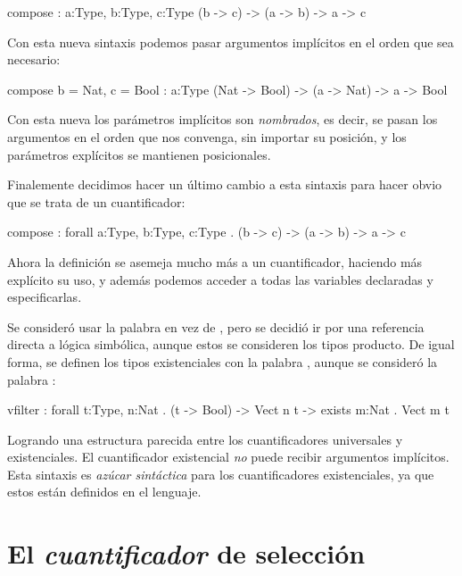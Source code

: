 \begin{blueleft}
\begin{anglercode}
compose : { a:Type, b:Type, c:Type } (b -> c) -> (a -> b) -> a -> c
\end{anglercode}

Con esta nueva sintaxis podemos pasar argumentos implícitos en el orden que sea necesario:

\begin{anglercode}
compose { b = Nat, c = Bool } : { a:Type } (Nat -> Bool) -> (a -> Nat) -> a -> Bool
\end{anglercode}

Con esta nueva los parámetros implícitos son \emph{nombrados}, es decir, se pasan los argumentos en el orden que nos convenga, sin importar su posición, y los parámetros explícitos se mantienen posicionales.

Finalemente decidimos hacer un último cambio a esta sintaxis para hacer obvio que se trata de un cuantificador:

\begin{anglercode}
compose : forall a:Type, b:Type, c:Type . (b -> c) -> (a -> b) -> a -> c
\end{anglercode}

Ahora la definición se asemeja mucho más a un cuantificador, haciendo más explícito su uso, y además podemos acceder a todas las variables declaradas y especificarlas.

Se consideró usar la palabra  en vez de , pero se decidió ir por una referencia directa a lógica simbólica, aunque estos se consideren los tipos producto. De igual forma, se definen los tipos existenciales con la palabra , aunque se consideró la palabra :

\begin{anglercode}
vfilter : forall t:Type, n:Nat . (t -> Bool) -> Vect n t -> exists m:Nat . Vect m t
\end{anglercode}

Logrando una estructura parecida entre los cuantificadores universales y existenciales. El cuantificador existencial \emph{no} puede recibir argumentos implícitos. Esta sintaxis es \emph{azúcar sintáctica} para los cuantificadores existenciales, ya que estos están definidos en el lenguaje.
\end{blueleft}

\section{El \emph{cuantificador} de selección}

